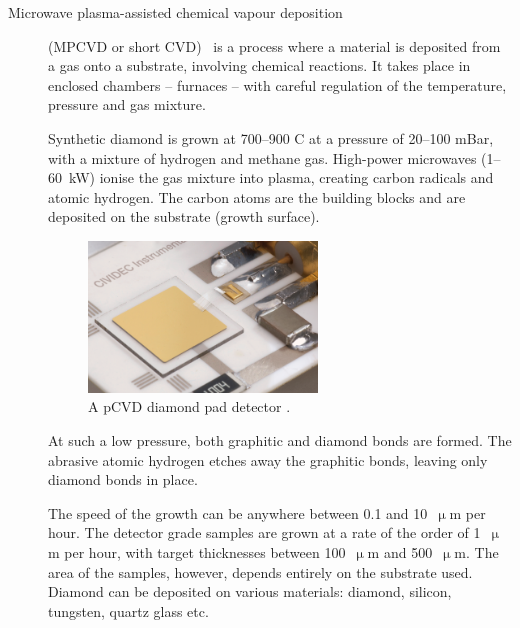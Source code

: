 \begin{description}
\item[Microwave plasma-assisted chemical vapour deposition] (MPCVD or short CVD)~\cite{CVD:00000, DIAM:00000} is a process where a material is deposited from a gas onto a substrate, involving chemical reactions. It takes place in enclosed chambers -- furnaces -- with careful regulation of the temperature, pressure and gas mixture.  %

Synthetic diamond is grown at 700--900 \textdegree C at a pressure of 20--100 mBar, with a mixture of hydrogen and methane gas. High-power microwaves (1--60~kW) ionise the gas mixture into plasma, creating carbon radicals and atomic hydrogen. The carbon atoms are the building blocks and are deposited on the substrate (growth surface).
\begin{figure}[!t]
\centering
\includegraphics[width=0.6\textwidth]{01_introduction/pics/cividecpcvd}
\caption{A pCVD diamond pad detector \cite{Cividec:00000}.}
\label{fig:cividecpcvd}
\end{figure}
At such a low pressure, both graphitic and diamond bonds are formed. The abrasive atomic hydrogen etches away the graphitic bonds, leaving only diamond bonds in place. %

The speed of the growth can be anywhere between 0.1 and 10~$\upmu$m per hour. %
The detector grade samples are grown at a rate of the order of 1~$\upmu$m per hour, with target thicknesses between 100~$\upmu$m and 500~$\upmu$m.
The area of the samples, however, depends entirely on the substrate used. Diamond can be deposited on various materials: diamond, silicon, tungsten, quartz glass etc. %


\end{description}
